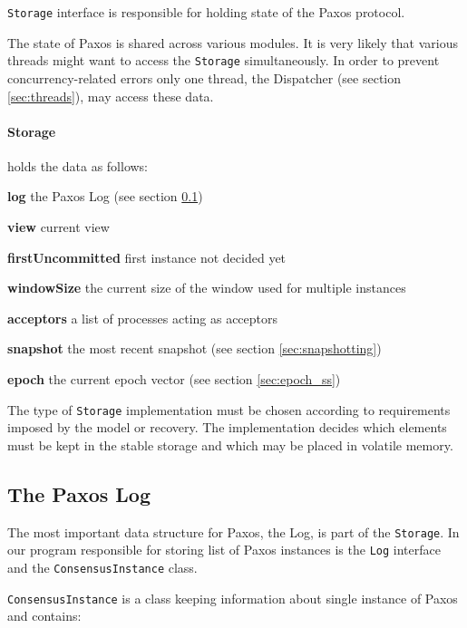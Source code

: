 \texttt{Storage} interface is responsible for holding state of the Paxos protocol.

The state of Paxos is shared across various modules.
It is very likely that various threads might want to access the \texttt{Storage} simultaneously. In order to prevent concurrency-related errors only one thread, the Dispatcher (see section \ref{sec:threads}), may access these data. 

\paragraph{\normalfont \ttfamily Storage}
holds the data as follows:
\begin{tightList}[\setlength{\labelwidth}{0em}]
  \item[\textbf{log}] the Paxos Log (see section \ref{subsec:the_paxos_log})
  \item[\textbf{view}] current view
  \item[\textbf{firstUncommitted}] first instance not decided yet
  \item[\textbf{windowSize}] the current size of the window used for multiple instances
  \item[\textbf{acceptors}] a list of processes acting as acceptors
  \item[\textbf{snapshot}] the most recent snapshot (see section \ref{sec:snapshotting})
  \item[\textbf{epoch}] the current epoch vector (see section \ref{sec:epoch_ss})
\end{tightList}

\strut

The type of \texttt{Storage} implementation must be chosen according to requirements imposed by the model or recovery.
The implementation decides which elements must be kept in the stable storage and which may be placed in volatile memory.

\subsection{The Paxos Log}
\label{subsec:the_paxos_log}

The most important data structure for Paxos, the Log, is part of the \texttt{Storage}.
In our program responsible for storing list of Paxos instances is the \texttt{Log} interface and the \texttt{Con\-sen\-susInstance} class.

\texttt{ConsensusInstance} is a class keeping information about single instance of Paxos and contains:

